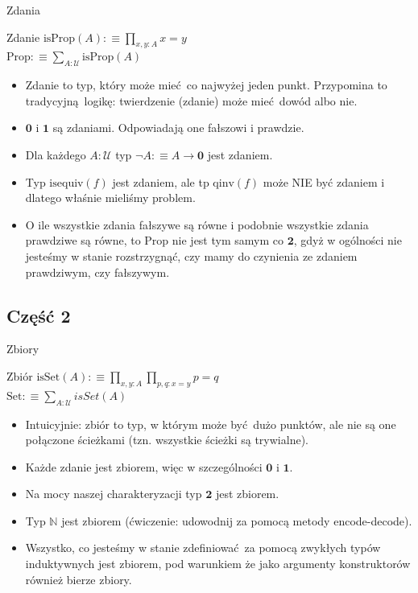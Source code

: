 \documentclass{beamer}
\newcommand{\defn}{:\equiv}
\newcommand{\U}{\mathcal{U}}
\newcommand{\qinv}{\text{qinv}}
\newcommand{\isequiv}{\text{isequiv}}
\newcommand{\isProp}{\text{isProp}}
\newcommand{\isSet}{\text{isSet}}
\newcommand{\Prop}{\text{Prop}}
\newcommand{\Set}{\text{Set}}
\begin{document}
\begin{frame}{Zdania}

\begin{block}{Zdanie}
$\isProp(A) \defn \prod_{x, y : A} x = y$ \\
$\Prop \defn \sum_{A : \U} \isProp(A)$
\end{block}

\begin{itemize}
	\item Zdanie to typ, który może mieć co najwyżej jeden punkt. Przypomina to tradycyjną logikę: twierdzenie (zdanie) może mieć dowód albo nie.
	\item $\textbf{0}$ i $\textbf{1}$ są zdaniami. Odpowiadają one fałszowi i prawdzie.
	\item Dla każdego $A : \U$ typ $\neg A \defn A \to \textbf{0}$ jest zdaniem.
	\item Typ $\isequiv(f)$ jest zdaniem, ale tp $\qinv(f)$ może NIE być zdaniem i dlatego właśnie mieliśmy problem.
	\item O ile wszystkie zdania fałszywe są równe i podobnie wszystkie zdania prawdziwe są równe, to $\Prop$ nie jest tym samym co $\textbf{2}$, gdyż w ogólności nie jesteśmy w stanie rozstrzygnąć, czy mamy do czynienia ze zdaniem prawdziwym, czy fałszywym.
\end{itemize}

\end{frame}

\subsection{Część 2}

\begin{frame}{Zbiory}

\begin{block}{Zbiór}
$\isSet(A) \defn \prod_{x, y : A} \prod_{p, q : x = y} p = q$ \\
$\Set \defn \sum_{A : \U} isSet(A)$
\end{block}

\begin{itemize}
	\item Intuicyjnie: zbiór to typ, w którym może być dużo punktów, ale nie są one połączone ścieżkami (tzn. wszystkie ścieżki są trywialne).
	\item Każde zdanie jest zbiorem, więc w szczególności $\textbf{0}$ i $\textbf{1}$.
	\item Na mocy naszej charakteryzacji typ $\textbf{2}$ jest zbiorem.
	\item Typ $\mathbb{N}$ jest zbiorem (ćwiczenie: udowodnij za pomocą metody encode-decode).
	\item Wszystko, co jesteśmy w stanie zdefiniować za pomocą zwykłych typów induktywnych jest zbiorem, pod warunkiem że jako argumenty konstruktorów również bierze zbiory.
\end{itemize}

\end{frame}
\end{document}
